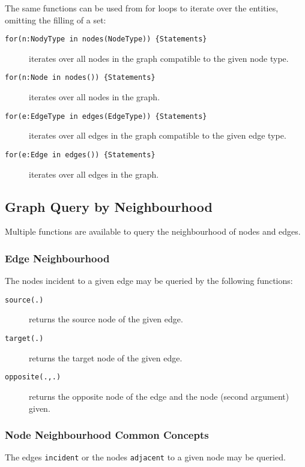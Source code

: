 The same functions can be used from for loops to iterate over the entities, omitting the filling of a set: 
\begin{description}
\item[\texttt{for(n:NodyType in nodes(NodeType)) \{Statements\}} ] iterates over all nodes in the graph compatible to the given node type.
\item[\texttt{for(n:Node in nodes()) \{Statements\}} ] iterates over all nodes in the graph.
\item[\texttt{for(e:EdgeType in edges(EdgeType)) \{Statements\}} ] iterates over all edges in the graph compatible to the given edge type.
\item[\texttt{for(e:Edge in edges()) \{Statements\}} ] iterates over all edges in the graph.
\end{description}

\subsection{Graph Query by Neighbourhood}\label{sub:querybyneighbourhood}

Multiple functions are available to query the neighbourhood of nodes and edges.

\subsubsection*{Edge Neighbourhood}

The nodes incident to a given edge may be queried by the following functions: 

\begin{description}
\item[\texttt{source(.)}] returns the source node of the given edge.
\item[\texttt{target(.)}] returns the target node of the given edge.
\item[\texttt{opposite(.,.)}] returns the opposite node of the edge and the node (second argument) given.
\end{description}

\subsubsection*{Node Neighbourhood Common Concepts}

The edges \texttt{incident} or the nodes \texttt{adjacent} to a given node may be queried.

